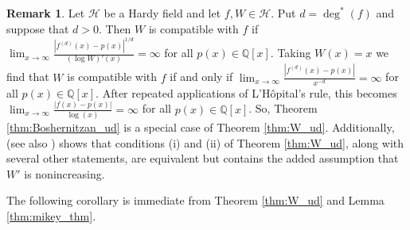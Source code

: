\documentclass[12pt]{article}
\theoremstyle{plain} %
\theoremstyle{definition} %
\newtheorem{remark}[theorem]{Remark}
\theoremstyle{plain}
\theoremstyle{plain}
\numberwithin{equation}{section}
\newcommand{\Q}{\mathbb{Q}}
\newcommand{\1}{\mathbbm{1}}
\newcommand{\oo}{\infty}
\begin{document}
\begin{remark}
Let $\mathcal{H}$ be a Hardy field and let $f,W\in\mathcal{H}$. Put $d= \deg^*(f)$ and suppose that $d>0$. Then $W$ is compatible with $f$ if $\lim_{x\to\oo}\frac{|f^{(d)}(x)-p(x)|^{1/d}}{(\log W)'(x)}=\oo$ for all $p(x)\in \Q[x]$. 
Taking $W(x)=x$ we find that $W$ is compatible with $f$ if and only if $\lim_{x\to\oo}\frac{|f^{(d)}(x)-p(x)|}{x^{-d}}=\oo$ for all $p(x)\in \Q[x]$. After repeated applications of L'H\^opital's rule, this becomes $\lim_{x\to\oo}\frac{|f(x)-p(x)|}{\log(x)}=\oo$ for all $p(x)\in \Q[x]$. So, Theorem \ref{thm:Boshernitzan_ud} is a special case of Theorem \ref{thm:W_ud}. 
Additionally, \cite[Theorem 1.6]{BKS2025} (see also \cite[Theorem 5.1]{Richter23}) shows that conditions (i) and (ii) of Theorem \ref{thm:W_ud}, along with several other statements, are equivalent but contains the added assumption that $W'$ is nonincreasing. 
\end{remark}

The following corollary is immediate from Theorem \ref{thm:W_ud} and Lemma \ref{thm:mikey_thm}.
\end{document}
